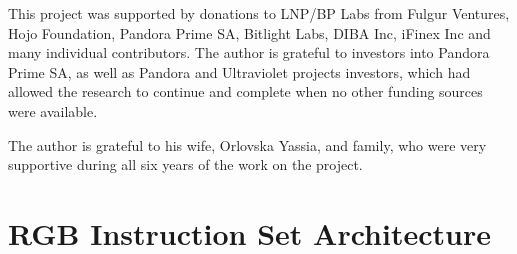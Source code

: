 \documentclass[9pt,oneside]{amsart}
\begin{document}
\begin{multicols}{2}
This project was supported by donations to LNP/BP Labs from Fulgur Ventures, Hojo Foundation,
Pandora Prime SA, Bitlight Labs, DIBA Inc, iFinex Inc and many individual contributors.
The author is grateful to investors into Pandora Prime SA,
as well as Pandora and Ultraviolet projects investors,
which had allowed the research to continue and complete
when no other funding sources were available.

The author is grateful to his wife, Orlovska Yassia, and family,
who were very supportive during all six years of the work on the project.





\end{multicols}

\newpage

\appendix
\section{RGB Instruction Set Architecture}\label{ap:ISA}
\end{document}
